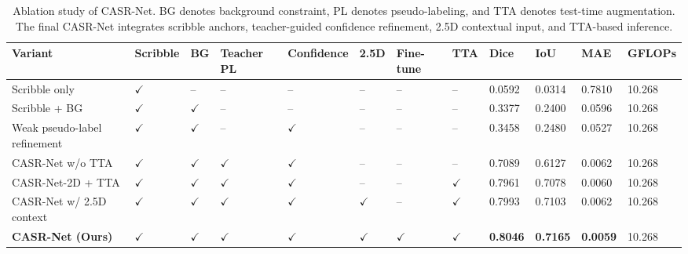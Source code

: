 \begin{table}
\caption{Ablation study of CASR-Net. BG denotes background constraint, PL denotes pseudo-labeling, and TTA denotes test-time augmentation. The final CASR-Net integrates scribble anchors, teacher-guided confidence refinement, 2.5D contextual input, and TTA-based inference.}
\label{tab:casrnet_ablation_paper_ready}
\begin{tabular}{llllllllllll}
\toprule
Variant & Scribble & BG & Teacher PL & Confidence & 2.5D & Fine-tune & TTA & Dice & IoU & MAE & GFLOPs \\
\midrule
Scribble only & $\checkmark$ & -- & -- & -- & -- & -- & -- & 0.0592 & 0.0314 & 0.7810 & 10.268 \\
Scribble + BG & $\checkmark$ & $\checkmark$ & -- & -- & -- & -- & -- & 0.3377 & 0.2400 & 0.0596 & 10.268 \\
Weak pseudo-label refinement & $\checkmark$ & $\checkmark$ & -- & $\checkmark$ & -- & -- & -- & 0.3458 & 0.2480 & 0.0527 & 10.268 \\
CASR-Net w/o TTA & $\checkmark$ & $\checkmark$ & $\checkmark$ & $\checkmark$ & -- & -- & -- & 0.7089 & 0.6127 & 0.0062 & 10.268 \\
CASR-Net-2D + TTA & $\checkmark$ & $\checkmark$ & $\checkmark$ & $\checkmark$ & -- & -- & $\checkmark$ & 0.7961 & 0.7078 & 0.0060 & 10.268 \\
CASR-Net w/ 2.5D context & $\checkmark$ & $\checkmark$ & $\checkmark$ & $\checkmark$ & $\checkmark$ & -- & $\checkmark$ & 0.7993 & 0.7103 & 0.0062 & 10.268 \\
\textbf{CASR-Net (Ours)} & $\checkmark$ & $\checkmark$ & $\checkmark$ & $\checkmark$ & $\checkmark$ & $\checkmark$ & $\checkmark$ & \textbf{0.8046} & \textbf{0.7165} & \textbf{0.0059} & 10.268 \\
\bottomrule
\end{tabular}
\end{table}
